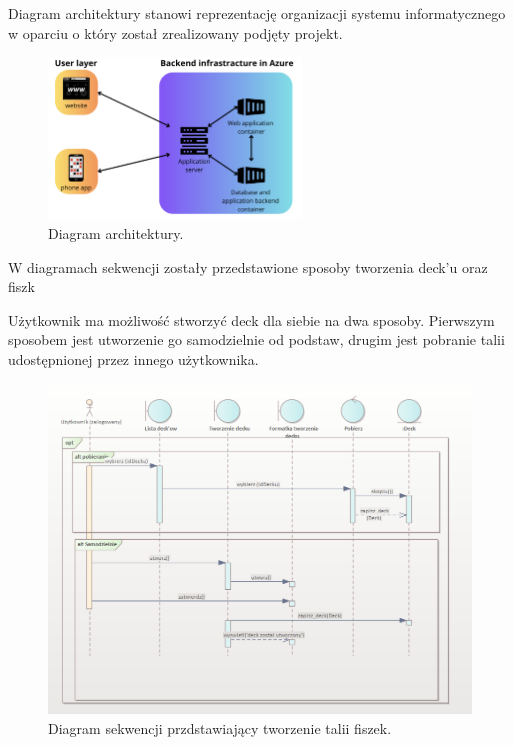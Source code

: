 \indent Diagram architektury stanowi reprezentację organizacji systemu informatycznego w oparciu o który został zrealizowany podjęty projekt.


\begin{figure}[H]
    \centering
    \includegraphics[width=0.6\textwidth]{chapters/chapter_6/diagram_architektury}
    \caption{Diagram architektury.}
    \label{img:diagram_architektury}
\end{figure}


\setlength{\parindent}{15pt}

\indent W diagramach sekwencji zostały przedstawione sposoby tworzenia deck’u oraz fiszk


\indent Użytkownik ma możliwość stworzyć deck dla siebie na dwa sposoby. Pierwszym sposobem  jest utworzenie go samodzielnie od podstaw, drugim jest pobranie talii udostępnionej przez innego użytkownika.
\begin{figure}[H]
    \centering
    \includegraphics[width=1\textwidth]{chapters/chapter_6/diagram_sekwencji_1}
    \caption{Diagram sekwencji przdstawiający tworzenie talii fiszek.}
    \label{img:diagram_sekwencji_1}
\end{figure}

